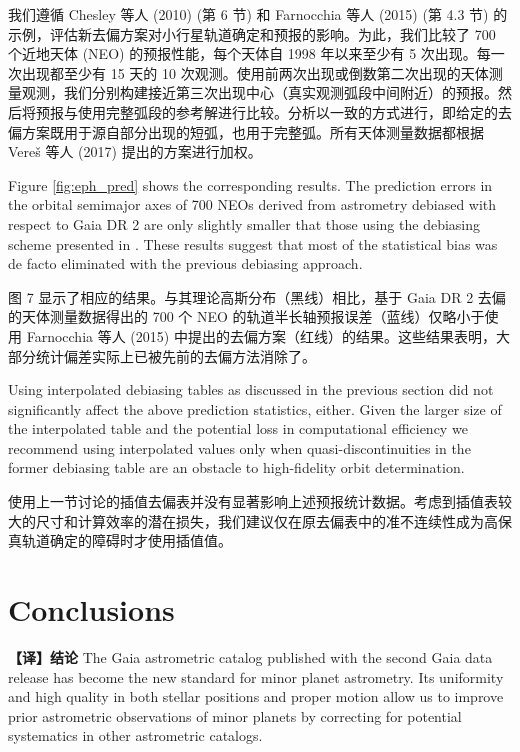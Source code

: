 \documentclass[review]{elsarticle}
\begin{document}
我们遵循 Chesley 等人 (2010) (第 6 节) 和 Farnocchia 等人 (2015) (第 4.3 节) 的示例，评估新去偏方案对小行星轨道确定和预报的影响。为此，我们比较了 700 个近地天体 (NEO) 的预报性能，每个天体自 1998 年以来至少有 5 次出现。每一次出现都至少有 15 天的 10 次观测。使用前两次出现或倒数第二次出现的天体测量观测，我们分别构建接近第三次出现中心（真实观测弧段中间附近）的预报。然后将预报与使用完整弧段的参考解进行比较。分析以一致的方式进行，即给定的去偏方案既用于源自部分出现的短弧，也用于完整弧。所有天体测量数据都根据 Vereš 等人 (2017) 提出的方案进行加权。

Figure \ref{fig:eph_pred} shows the corresponding results.
The prediction errors in the orbital semimajor axes of 700 NEOs derived from astrometry debiased with respect to Gaia DR 2 are only slightly smaller that those using the debiasing scheme presented in \citet{farnocchia15}. These results suggest that most of the statistical bias was de facto eliminated with the previous debiasing approach.

图 7 显示了相应的结果。与其理论高斯分布（黑线）相比，基于 Gaia DR 2 去偏的天体测量数据得出的 700 个 NEO 的轨道半长轴预报误差（蓝线）仅略小于使用 Farnocchia 等人 (2015) 中提出的去偏方案（红线）的结果。这些结果表明，大部分统计偏差实际上已被先前的去偏方法消除了。

%
Using interpolated debiasing tables as discussed in the previous section did not significantly affect the above prediction statistics, either. Given the larger size of the interpolated table and the potential loss in computational efficiency we recommend using interpolated values only when quasi-discontinuities in the former debiasing table are an obstacle to high-fidelity orbit determination.  

使用上一节讨论的插值去偏表并没有显著影响上述预报统计数据。考虑到插值表较大的尺寸和计算效率的潜在损失，我们建议仅在原去偏表中的准不连续性成为高保真轨道确定的障碍时才使用插值值。

\section{Conclusions}
\textbf{【译】结论}
\label{sec:conclusions}
The Gaia astrometric catalog published with the second Gaia data release has become the new standard for minor planet astrometry. 
Its uniformity and high quality in both stellar positions and proper motion allow us to improve prior astrometric observations of minor planets by correcting for potential systematics in other astrometric catalogs. 
\end{document}
